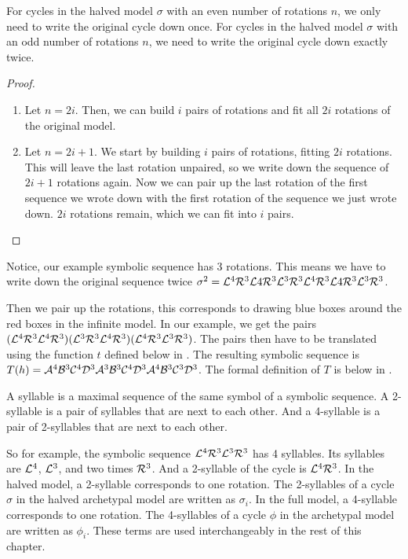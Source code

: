 \begin{lemma}
	\label{lemma:writing.down}
	For cycles in the halved model $\sigma$ with an even number of rotations $n$, we only need to write the original cycle down once.
	For cycles in the halved model $\sigma$ with an odd number of rotations $n$, we need to write the original cycle down exactly twice.
\end{lemma}

\begin{proof} \phantom{x}
	\begin{enumerate}
		\item Let $n = 2i$. Then, we can build $i$ pairs of rotations and fit all $2i$ rotations of the original model.
		\item Let $n = 2i + 1$. We start by building $i$ pairs of rotations, fitting $2i$ rotations.
		      This will leave the last rotation unpaired, so we write down the sequence of $2i + 1$ rotations again.
		      Now we can pair up the last rotation of the first sequence we wrote down with the first rotation of the sequence we just wrote down.
		      $2i$ rotations remain, which we can fit into $i$ pairs.
	\end{enumerate}
\end{proof}

Notice, our example symbolic sequence has 3 rotations.
This means we have to write down the original sequence twice $\sigma^2 = \mathcal{L}^4\mathcal{R}^3\mathcal{L}4\mathcal{R}^3\mathcal{L}^3\mathcal{R}^3\mathcal{L}^4\mathcal{R}^3\mathcal{L}4\mathcal{R}^3\mathcal{L}^3\mathcal{R}^3$.

Then we pair up the rotations, this corresponds to drawing blue boxes around the red boxes in the infinite model.
In our example, we get the pairs $(\mathcal{L}^4\mathcal{R}^3\mathcal{L}^4\mathcal{R}^3)(\mathcal{L}^3\mathcal{R}^3\mathcal{L}^4\mathcal{R}^3)(\mathcal{L}^4\mathcal{R}^3\mathcal{L}^3\mathcal{R}^3)$.
The pairs then have to be translated using the function $t$ defined below in .
The resulting symbolic sequence is $T(h) = \mathcal{A}^4\mathcal{B}^3\mathcal{C}^4\mathcal{D}^3\mathcal{A}^3\mathcal{B}^3\mathcal{C}^4\mathcal{D}^3\mathcal{A}^4\mathcal{B}^3\mathcal{C}^3\mathcal{D}^3$.
The formal definition of $T$ is below in .

\begin{definition}[Syllables]
	A syllable is a maximal sequence of the same symbol of a symbolic sequence.
	A 2-syllable is a pair of syllables that are next to each other.
	And a 4-syllable is a pair of 2-syllables that are next to each other.
\end{definition}

So for example, the symbolic sequence $\mathcal{L}^4\mathcal{R}^3\mathcal{L}^3\mathcal{R}^3$ has 4 syllables.
Its syllables are $\mathcal{L}^4$, $\mathcal{L}^3$, and two times $\mathcal{R}^3$.
And a 2-syllable of the cycle is $\mathcal{L}^4\mathcal{R}^3$.
In the halved model, a 2-syllable corresponds to one rotation.
The 2-syllables of a cycle $\sigma$ in the halved archetypal model are written as $\sigma_i$.
In the full model, a 4-syllable corresponds to one rotation.
The 4-syllables of a cycle $\phi$ in the archetypal model are written as $\phi_i$.
These terms are used interchangeably in the rest of this chapter.


